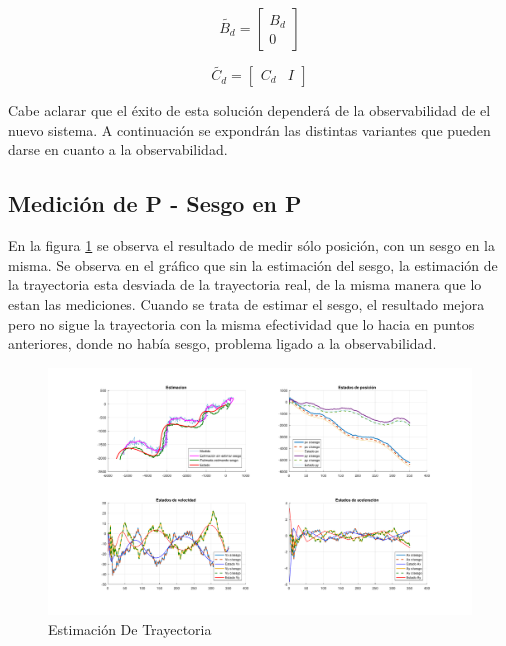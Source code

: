 	\begin{equation*}
			\tilde{B_{d}} = \begin{bmatrix} B_{d} \\[0.3em] 0 \end{bmatrix}
	\end{equation*}
	
	\begin{equation*}
			\tilde{C_{d}} = \begin{bmatrix} C_{d} & I \end{bmatrix}
	\end{equation*}
	
	Cabe aclarar que el éxito de esta solución dependerá de la observabilidad de el nuevo sistema. A continuación se expondrán las distintas variantes que pueden darse en cuanto a la observabilidad.


\subsection{Medición de P - Sesgo en P}

	En la figura \ref{fig:ej4a} se observa el resultado de medir sólo posición, con un sesgo en la misma. Se observa en el gráfico que sin la estimación del sesgo, la estimación de la trayectoria esta desviada de la trayectoria real, de la misma manera que lo estan las mediciones. Cuando se trata de estimar el sesgo, el resultado mejora pero no sigue la trayectoria con la misma efectividad que lo hacia en puntos anteriores, donde no había sesgo, problema ligado a la observabilidad.

	\begin{figure}[H]
		\centering
		\includegraphics[width=1.0\textwidth,keepaspectratio]{Figuras/graf_ej4a.pdf}
		\caption{Estimación De Trayectoria}
		\label{fig:ej4a}
	\end{figure}
	
